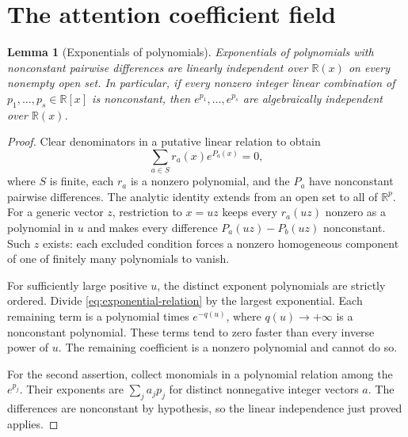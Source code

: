 \documentclass[11pt]{article}
\newtheorem{lemma}[lemma]{Lemma}
\theoremstyle{definition}
\theoremstyle{remark}
\newcommand{\R}{\mathbb R}
\begin{document}
\section{The attention coefficient field}
\label{sec:attention}
\begin{lemma}[Exponentials of polynomials]
\label{lem:independence}
Exponentials of polynomials with nonconstant pairwise differences
are linearly independent over $\R(x)$ on every nonempty open set.
In particular, if every nonzero integer linear combination of
$p_1,\ldots,p_s\in\R[x]$ is nonconstant, then
$e^{p_1},\ldots,e^{p_s}$ are algebraically independent over $\R(x)$.
\end{lemma}
\begin{proof}
Clear denominators in a putative linear relation to obtain
\begin{equation}
 \sum_{a\in S} r_a(x)e^{P_a(x)}=0,
 \label{eq:exponential-relation}
\end{equation}
where $S$ is finite, each $r_a$ is a nonzero polynomial, and the
$P_a$ have nonconstant pairwise differences. The analytic identity extends from
an open set to all of $\R^p$. For a generic vector $z$, restriction to
$x=uz$ keeps every $r_a(uz)$ nonzero as a polynomial in $u$ and makes
every difference $P_a(uz)-P_b(uz)$ nonconstant. Such $z$ exists: each
excluded condition forces a nonzero homogeneous component of one of
finitely many polynomials to vanish.

For sufficiently large positive $u$, the distinct exponent polynomials
are strictly ordered. Divide \cref{eq:exponential-relation} by the
largest exponential. Each remaining term is a polynomial times
$e^{-q(u)}$, where $q(u)\to+\infty$ is a nonconstant polynomial. These
terms tend to zero faster than every inverse power of $u$. The
remaining coefficient is a nonzero polynomial and cannot do so.

For the second assertion, collect monomials in a polynomial relation
among the $e^{p_j}$. Their exponents are $\sum_j a_jp_j$ for distinct
nonnegative integer vectors $a$. The differences are nonconstant by
hypothesis, so the linear independence just proved applies.
\end{proof}
\end{document}
